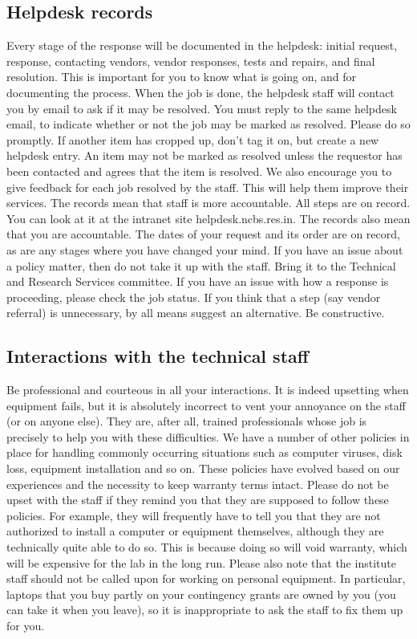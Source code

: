 \documentclass[a4paper]{extarticle}
\begin{document}
\subsection{Helpdesk records}
Every stage of the response will be documented in the helpdesk: initial
request, response, contacting vendors, vendor responses, tests and repairs, and final
resolution. This is important for you to know what is going on, and for documenting the
process. When the job is done, the helpdesk staff will contact you by email to ask if it may
be resolved. You must reply to the same helpdesk email, to indicate whether or not the job
may be marked as resolved. Please do so promptly. If another item has cropped up, don’t tag
it on, but create a new helpdesk entry. An item may not be marked as resolved unless the
requestor has been contacted and agrees that the item is resolved. We also encourage you to
give feedback for each job resolved by the staff. This will help them improve their services.
The records mean that staff is more accountable. All steps are on record. You can look at it
at the intranet site helpdesk.ncbs.res.in. The records also mean that you are accountable. The
dates of your request and its order are on record, as are any stages where you have changed
your mind. If you have an issue about a policy matter, then do not take it up with the staff.
Bring it to the Technical and Research Services committee. If you have an issue with how a
response is proceeding, please check the job status. If you think that a step (say vendor
referral) is unnecessary, by all means suggest an alternative. Be constructive.

\subsection{Interactions with the technical staff}
Be professional and courteous in all your
interactions. It is indeed upsetting when equipment fails, but it is absolutely incorrect to vent
your annoyance on the staff (or on anyone else). They are, after all, trained professionals
whose job is precisely to help you with these difficulties. We have a number of other
policies in place for handling commonly occurring situations such as computer viruses, disk
loss, equipment installation and so on. These policies have evolved based on our
experiences and the necessity to keep warranty terms intact. Please do not be upset with the
staff if they remind you that they are supposed to follow these policies. For example, they
will frequently have to tell you that they are not authorized to install a computer or
equipment themselves, although they are technically quite able to do so. This is because
doing so will void warranty, which will be expensive for the lab in the long run. Please also
note that the institute staff should not be called upon for working on personal equipment. In
particular, laptops that you buy partly on your contingency grants are owned by you (you
can take it when you leave), so it is inappropriate to ask the staff to fix them up for you.
\end{document}
